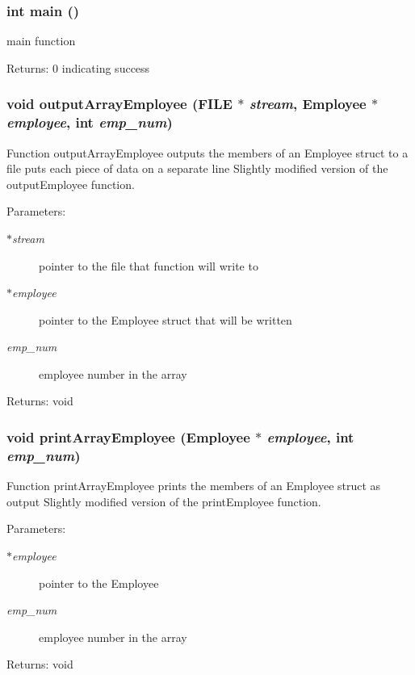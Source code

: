 \subsubsection{\setlength{\rightskip}{0pt plus 5cm}int main ()}\label{myarrays_8c_446c6b9a1a4dbab517fbb760870458a3}


main function \begin{Desc}
\item[Returns:]0 indicating success \end{Desc}
\subsubsection{\setlength{\rightskip}{0pt plus 5cm}void output\-Array\-Employee (FILE $\ast$ {\em stream}, \bf{Employee} $\ast$ {\em employee}, int {\em emp\_\-num})}\label{myarrays_8c_624151f1ec012dcbd5c4b3d7171dec93}


Function output\-Array\-Employee outputs the members of an Employee struct to a file puts each piece of data on a separate line Slightly modified version of the output\-Employee function. \begin{Desc}
\item[Parameters:]
\begin{description}
\item[{\em $\ast$stream}]pointer to the file that function will write to \item[{\em $\ast$employee}]pointer to the Employee struct that will be written \item[{\em emp\_\-num}]employee number in the array \end{description}
\end{Desc}
\begin{Desc}
\item[Returns:]void \end{Desc}
\subsubsection{\setlength{\rightskip}{0pt plus 5cm}void print\-Array\-Employee (\bf{Employee} $\ast$ {\em employee}, int {\em emp\_\-num})}\label{myarrays_8c_3ac37e8b3774f7487054087208c16331}


Function print\-Array\-Employee prints the members of an Employee struct as output Slightly modified version of the print\-Employee function. \begin{Desc}
\item[Parameters:]
\begin{description}
\item[{\em $\ast$employee}]pointer to the Employee \item[{\em emp\_\-num}]employee number in the array \end{description}
\end{Desc}
\begin{Desc}
\item[Returns:]void \end{Desc}
